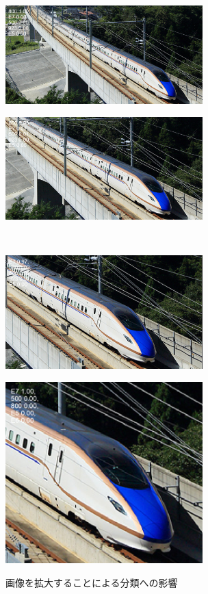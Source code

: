 \begin{figure}[htbp]
	\begin{minipage}[b]{.5\linewidth}
		\includegraphics[width=3in]{fig/E7/E7_0000.png}
		\label{PIC1}
	\end{minipage}%
	\begin{minipage}[b]{.5\linewidth}
		\includegraphics[width=3in]{fig/E7/E7_0000-1.png}
		\label{PIC2}
	\end{minipage}%
	\\ %
	\begin{minipage}[b]{.5\linewidth}
		\includegraphics[width=3in]{fig/E7/E7_0000-2.png}
		\label{PIC3.jpg}
	\end{minipage}%
	\begin{minipage}[b]{.5\linewidth}
		\includegraphics[width=3in]{fig/E7/E7_0000-3.png}
		\label{PIC4}
	\end{minipage}%

	\caption{画像を拡大することによる分類への影響}\label{DENSHA}
\end{figure}



